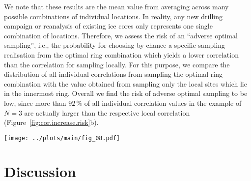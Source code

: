 \documentclass[draft]{agujournal2019}
\begin{document}
We note that these results are the mean value from averaging across many
possible combinations of individual locations. In reality, any new drilling
campaign or reanalysis of existing ice cores only represents one single
combination of locations. Therefore, we assess the risk of an ``adverse optimal
sampling'', i.e., the probability for choosing by chance a specific sampling
realisation from the optimal ring combination which yields a lower correlation
than the correlation for sampling locally. For this purpose, we compare the
distribution of all individual correlations from sampling the optimal ring
combination with the value obtained from sampling only the local sites which lie
in the innermost ring. Overall we find the risk of adverse optimal sampling to
be low, since more than $92\,\%$ of all individual correlation values in the
example of $N=3$ are actually larger than the respective local correlation
(Figure~\ref{fig:cor.increase.risk}b).

\begin{figure*}[t]%
\centering
\texttt{[image: ../plots/main/fig\_08.pdf]}
\caption{%
  Gain in correlation and risk of adverse sampling. (\textbf{a}) The average
  correlation with the target temperature at the EDML (red) and Vostok (blue)
  sites depending on the number of locations, $N$, used for averaging the
  $\delta^{18}\mathrm{O}^{\mathrm{(pw)}}$ time series. Sampling is performed
  either locally from the innermost ring only (dashed lines), or from all
  possible individual combinations of locations for the respective optimal ring
  combination determined for each $N$ (solid lines). Compared to the local
  samples which show virtually no increase with the number of sampled locations,
  the correlation increases markedly with $N$ when sampling from the optimal
  rings, as highlighted by the shaded area. (\textbf{b}) Histogram of all
  possible individual correlations for sampling from the optimal ring
  combination when averaging $N=3$ locations compared to the correlation
  (vertical lines) for sampling from the innermost ring only, displayed for the
  EDML (red) and Vostok (blue) target sites. For more than $90\,\%$ of the
  optimal ring combination samples, the correlation is higher than the local
  value.}
\label{fig:cor.increase.risk}%
\end{figure*}%

\section{Discussion}\label{discussion}
\end{document}
